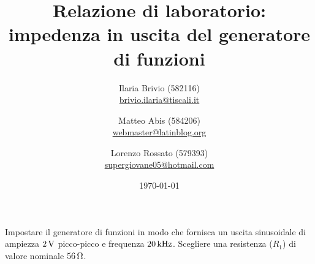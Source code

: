 \documentclass[italian,a4paper]{article}
\begin{document}
\title{Relazione di laboratorio: impedenza in uscita del generatore di funzioni}
\author{\normalsize Ilaria Brivio (582116)\\%
\normalsize \url{brivio.ilaria@tiscali.it}%
\and %
\normalsize Matteo Abis (584206)\\ %
\normalsize \url{webmaster@latinblog.org}
\and %
\normalsize Lorenzo Rossato (579393)\\ %
\normalsize \url{supergiovane05@hotmail.com}}
\date{\today}
\maketitle
\thispagestyle{empty}
\noindent Impostare il generatore di funzioni in modo che fornisca un uscita sinusoidale di ampiezza $\unit[2]{V}$
picco-picco e frequenza $\unit[20]{kHz}$. Scegliere una resistenza ($R_1$) di valore nominale
$\unit[56]{\ohm}$. 
\end{document}
